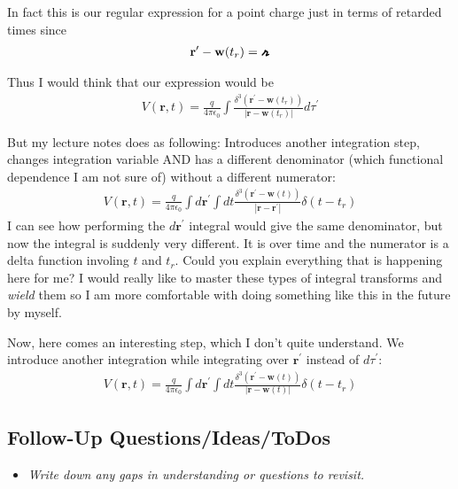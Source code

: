 In fact this is our regular expression for a point charge just in terms of retarded times since \begin{align*}
    \mathbf{r}^{\prime} - \mathbf{w}(t_r) = \griffr[4] 
\end{align*}

Thus I would think that our expression would be \begin{align*}
    V(\mathbf{r},t) = \frac{q}{4\pi\epsilon_0} \int \frac{\delta ^3 (\mathbf{r}^{\prime} - \mathbf{w}(t_r))}{\left| \mathbf{r} - \mathbf{w}(t_r) \right| } d \tau ^{\prime} 
\end{align*}

But my lecture notes does as following: Introduces another integration step, changes integration variable AND has a different denominator (which functional dependence I am not sure of) without a different numerator:
\begin{align*}
    V(\mathbf{r}, t) = \frac{q}{4\pi\epsilon_0} \int d \mathbf{r}^{\prime}  \int dt \frac{\delta ^3 (\mathbf{r}^{\prime} - \mathbf{w}(t))}{\left| \mathbf{r} - \mathbf{r}^{\prime}  \right| } \delta(t - t_r)
\end{align*}
I can see how performing the \(d \mathbf{r}^{\prime} \) integral would give the same denominator, but now the integral is suddenly very different. It is over time and the numerator is a delta function involing \(t\) and \(t_r\). Could you explain everything that is happening here for me? I would really like to master these types of integral transforms and \textit{wield} them so I am more comfortable with doing something like this in the future by myself.   


Now, here comes an interesting step, which I don't quite understand. We introduce another integration while integrating over \(\mathbf{r}^{\prime} \) instead of \(d \tau ^{\prime} \): \begin{align*}
    V(\mathbf{r}, t) = \frac{q}{4\pi\epsilon_0} \int d \mathbf{r}^{\prime}  \int dt \frac{\delta ^3 (\mathbf{r}^{\prime} - \mathbf{w}(t))}{\left| \mathbf{r} - \mathbf{w}(t)  \right| } \delta(t - t_r)
\end{align*}

\subsection*{Follow-Up Questions/Ideas/ToDos}
\begin{itemize}
    \item \textit{Write down any gaps in understanding or questions to revisit.}
\end{itemize}
